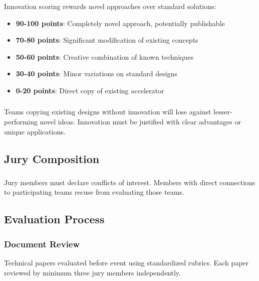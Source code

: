 \subsubsection{}
Innovation scoring rewards novel approaches over standard solutions:

\begin{itemize}[noitemsep]
    \item \textbf{90-100 points}: Completely novel approach, potentially publishable
    \item \textbf{70-80 points}: Significant modification of existing concepts
    \item \textbf{50-60 points}: Creative combination of known techniques
    \item \textbf{30-40 points}: Minor variations on standard designs
    \item \textbf{0-20 points}: Direct copy of existing accelerator
\end{itemize}

\subsubsection{}
Teams copying existing designs without innovation will lose against lesser-performing novel ideas. Innovation must be justified with clear advantages or unique applications.

\subsection{Jury Composition}

\subsubsection{}
Jury members must declare conflicts of interest. Members with direct connections to participating teams recuse from evaluating those teams.

\subsection{Evaluation Process}

\subsubsection{Document Review}
Technical papers evaluated before event using standardized rubrics. Each paper reviewed by minimum three jury members independently.


